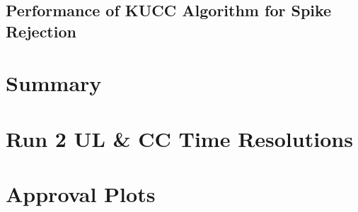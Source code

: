 \documentclass{cmspaper}
\begin{document}
\subsection{Performance of KUCC Algorithm for Spike Rejection \label{sec:resspkdata}}

\FloatBarrier

\section{Summary \label{sec:conclusion}}

\FloatBarrier

\pagebreak
\FloatBarrier
\medskip
\printbibliography[heading=bibnumbered,title={References}] 


\pagebreak
\FloatBarrier
\medskip
\appendix
\section {Run 2 UL \& CC Time Resolutions \label{sec:fullres}}


\pagebreak
\newpage
\FloatBarrier
\medskip
\section {Approval Plots \label{sec:plots}}

\end{document}
